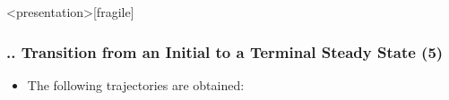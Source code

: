 \documentclass[11pt,aspectratio=169]{beamer}
\begin{document}
\begin{frame}<presentation>[fragile]
	\frametitle{{\thesection.\thesubsection.\thesubsubsection} Transition from an Initial to a Terminal Steady State (5)}
	\begin{itemize}
		\item The following trajectories are obtained:
		\begin{figure}
			\centering
			\qquad
			\qquad
		\end{figure}
	\end{itemize}
\end{frame}
\end{document}
